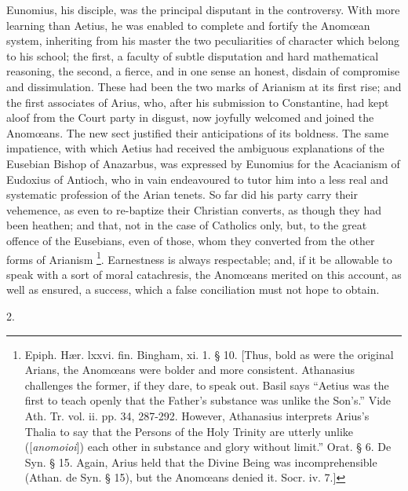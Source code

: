 Eunomius, his disciple, was the principal disputant in the
controversy. With more learning than Aetius, he was enabled to
complete and fortify the Anomœan system, inheriting from his master
the two peculiarities of character which belong to his school; the
first, a faculty of subtle disputation and hard mathematical
reasoning, the second, a fierce, and in one sense an honest, disdain
of compromise and dissimulation. These had been the two marks of
Arianism at its first rise; and the first associates of Arius, who,
after his submission to Constantine, had kept aloof from the Court
party in disgust, now joyfully welcomed and joined the Anomœans. The
new sect justified their anticipations of its boldness. The same
impatience, with which Aetius had received the ambiguous
explanations of the Eusebian Bishop of Anazarbus, was expressed by
Eunomius for the Acacianism of Eudoxius of Antioch, who in vain
endeavoured to tutor him into a less real and systematic profession of
the Arian tenets. So far did his party carry their vehemence, as even
to re-baptize their Christian converts, as though they had been
heathen; and that, not in the case of Catholics only, but, to the
great offence of the Eusebians, even of those, whom they converted
from the other forms of Arianism \footnote{Epiph. Hær. lxxvi. fin. Bingham, xi. 1. §
10. [Thus, bold as were the original Arians, the Anomœans were bolder
and more consistent. Athanasius challenges the former, if they dare,
to speak out. Basil says ``Aetius was the first to teach openly
that the Father's substance was unlike the Son's.'' Vide Ath. Tr.
vol. ii. pp. 34, 287-292. However, Athanasius interprets Arius's
Thalia to say that the Persons of the Holy Trinity are utterly unlike
([\emph{anomoioi}]) each other in substance and glory without
limit.'' Orat. § 6. De Syn. § 15. Again, Arius held that the
Divine Being was incomprehensible (Athan. de Syn. § 15), but the Anomœans denied it. Socr. iv. 7.]}. Earnestness is always respectable; and, if it be allowable to
speak with a sort of moral catachresis, the Anomœans merited on this
account, as well as ensured, a success, which a false conciliation
must not hope to obtain.

2.


